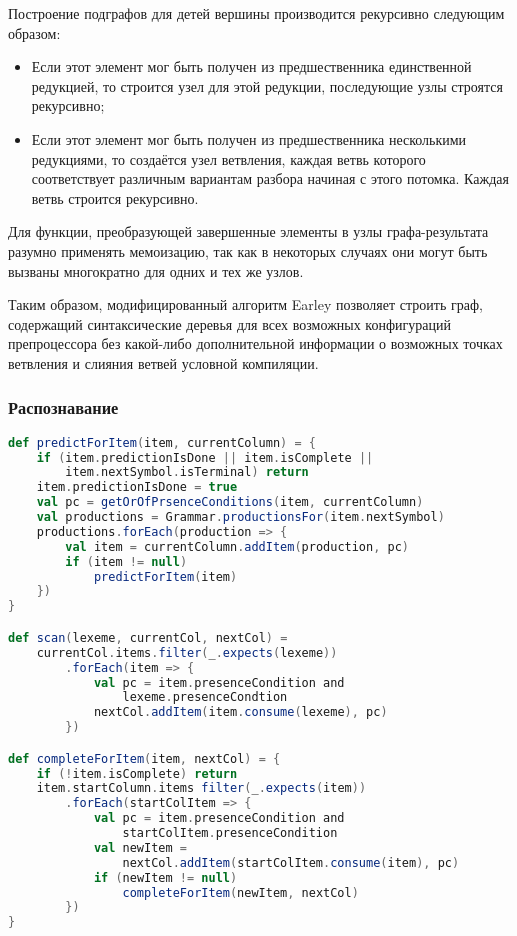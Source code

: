 Построение подграфов для детей вершины производится рекурсивно следующим образом:

\begin{itemize}
\item Если этот элемент мог быть получен из предшественника единственной редукцией, то строится узел для этой редукции, последующие узлы строятся рекурсивно;
\item Если этот элемент мог быть получен из предшественника несколькими редукциями, то создаётся узел ветвления, каждая ветвь которого соответствует различным вариантам разбора начиная с этого потомка. Каждая ветвь строится рекурсивно.
\end{itemize}

Для функции, преобразующей завершенные элементы в узлы графа-результата разумно применять мемоизацию, так как в некоторых случаях они могут быть вызваны многократно для одних и тех же узлов.

Таким образом, модифицированный алгоритм Earley позволяет строить граф, содержащий синтаксические деревья для всех возможных конфигураций препроцессора без какой-либо дополнительной информации о возможных точках ветвления и слияния ветвей условной компиляции.

\subsubsection{Распознавание}




\begin{minipage}{\linewidth}
\begin{lstlisting}[caption={Псевдокод модифицированных процедур алгоритма Earley},language=Scala,label=modearleyprocs]
def predictForItem(item, currentColumn) = {
	if (item.predictionIsDone || item.isComplete || 
		item.nextSymbol.isTerminal) return
	item.predictionIsDone = true
	val pc = getOrOfPrsenceConditions(item, currentColumn)
	val productions = Grammar.productionsFor(item.nextSymbol)
	productions.forEach(production => {
		val item = currentColumn.addItem(production, pc)
		if (item != null)
			predictForItem(item)
	})
}

def scan(lexeme, currentCol, nextCol) = 
	currentCol.items.filter(_.expects(lexeme))
		.forEach(item => {
			val pc = item.presenceCondition and
				lexeme.presenceCondtion
			nextCol.addItem(item.consume(lexeme), pc)
		})

def completeForItem(item, nextCol) = {
	if (!item.isComplete) return
	item.startColumn.items filter(_.expects(item))
		.forEach(startColItem => {
			val pc = item.presenceCondition and 
				startColItem.presenceCondition
			val newItem = 
				nextCol.addItem(startColItem.consume(item), pc)
			if (newItem != null)
				completeForItem(newItem, nextCol)		
		})
}
\end{lstlisting}
\end{minipage}


